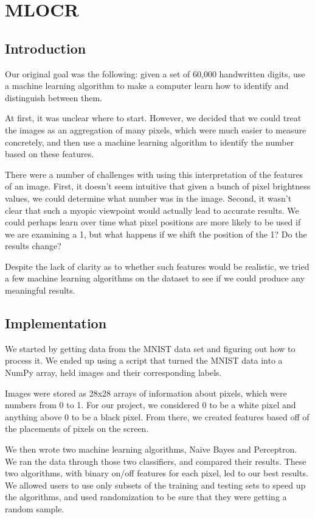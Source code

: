 \documentclass{article}
\theoremstyle{remark}
\begin{document}
	 \section*{MLOCR}
	\label*{Optical Character Recognition using Machine Learning}
	   \subsection*{Introduction}
     Our original goal was the following: given a set of 60,000 handwritten digits, use a machine learning algorithm to make a computer learn how to identify and distinguish between them.

     At first, it was unclear where to start. However, we decided that we could treat the images as an aggregation of many pixels, which were much easier to measure concretely, and then use a machine learning algorithm to identify the number based on these features.

     There were a number of challenges with using this interpretation of the features of an image. First, it doesn't seem intuitive that given a bunch of pixel brightness values, we could determine what number was in the image. Second, it wasn't clear that such a myopic viewpoint would actually lead to accurate results. We could perhaps learn over time what pixel positions are more likely to be used if we are examining a 1, but what happens if we shift the position of the 1? Do the results change?

     Despite the lack of clarity as to whether such features would be realistic, we tried a few machine learning algorithms on the dataset to see if we could produce any meaningful results.
     \subsection*{Implementation}
    	We started by getting data from the MNIST data set and figuring out how to process it. We ended up using a script that turned the MNIST data into a NumPy array, held images and their corresponding labels.

    	Images were stored as 28x28 arrays of information about pixels, which were numbers from 0 to 1. For our project, we considered 0 to be a white pixel and anything above 0 to be a black pixel. From there, we created features based off of the placements of pixels on the screen.

    	We then wrote two machine learning algorithms, Naive Bayes and Perceptron. We ran the data through those two classifiers, and compared their results. These two algorithms, with binary on/off features for each pixel, led to our best results. We allowed users to use only subsets of the training and testing sets to speed up the algorithms, and used randomization to be sure that they were getting a random sample.
\end{document}
